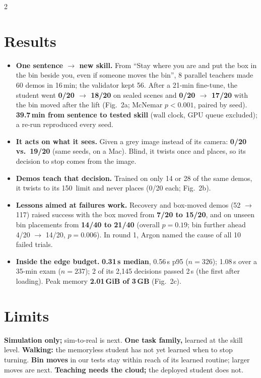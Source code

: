 \documentclass[9pt]{extarticle}
\newcommand{\head}[1]{\textbf{#1}\hspace{0.3em}}
\begin{document}
\begin{multicols}{2}
\section{Results}
\begin{itemize}
\item \head{One sentence $\rightarrow$ new skill.} From ``Stay where you are and put the box in the bin beside you, even if someone moves the bin'', 8 parallel teachers made 60 demos in 16\,min; the validator kept 56. After a 21-min fine-tune, the student went \textbf{0/20 $\rightarrow$ 18/20} on sealed scenes and \textbf{0/20 $\rightarrow$ 17/20} with the bin moved after the lift (Fig.~2a; McNemar $p<0.001$, paired by seed). \textbf{39.7\,min from sentence to tested skill} (wall clock, GPU queue excluded); a re-run reproduced every seed.
\item \head{It acts on what it sees.} Given a grey image instead of its camera: \textbf{0/20 vs.\ 19/20} (same seeds, on a Mac). Blind, it twists once and places, so its decision to stop comes from the image.
\item \head{Demos teach that decision.} Trained on only 14 or 28 of the same demos, it twists to its 150\textdegree\ limit and never places (0/20 each; Fig.~2b).
\item \head{Lessons aimed at failures work.} Recovery and box-moved demos (52 $\rightarrow$ 117) raised success with the box moved from \textbf{7/20 to 15/20}, and on unseen bin placements from \textbf{14/40 to 21/40} (overall $p=0.19$; bin further ahead 4/20 $\rightarrow$ 14/20, $p=0.006$). In round 1, Argon named the cause of all 10 failed trials.
\item \head{Inside the edge budget.} \textbf{0.31\,s median}, 0.56\,s p95 ($n=326$); 1.08\,s over a 35-min exam ($n=237$); 2 of its 2,145 decisions passed 2\,s (the first after loading). Peak memory \textbf{2.01\,GiB of 3\,GB} (Fig.~2c).
\end{itemize}

\section{Limits}
\head{Simulation only;} sim-to-real is next. \head{One task family,} learned at the skill level. \head{Walking:} the memoryless student has not yet learned when to stop turning. \head{Bin moves} in our tests stay within reach of its learned routine; larger moves are next. \head{Teaching needs the cloud;} the deployed student does not.


\end{multicols}
\end{document}
